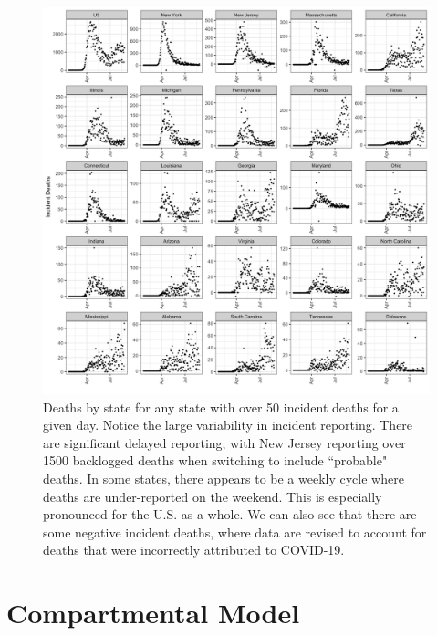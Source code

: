 \documentclass{umassthesis}          %
\begin{document}
 \begin{figure}
     \centering
     \includegraphics[scale=.14]{data_plot.png}
     \caption{Deaths by state for any state with over 50 incident deaths for a given day. Notice the large variability in incident reporting. There are significant delayed reporting, with New Jersey reporting over 1500 backlogged deaths when switching to include ``probable" deaths. In some states, there appears to be a weekly cycle where deaths are under-reported on the weekend. This is especially pronounced for the U.S. as a whole. We can also see that there are some negative incident deaths, where data are revised to account for deaths that were incorrectly attributed to COVID-19. }
     \label{fig:data}
 \end{figure}
 
 \section{Compartmental Model}
\end{document}
